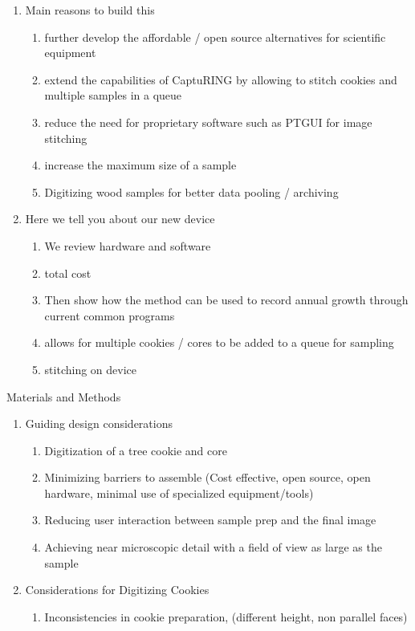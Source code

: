 \documentclass{article}
\begin{document}
\begin{outline}[enumerate]
\begin{enumerate}
	\item Main reasons to build this 
		\begin{enumerate} 
		\item further develop the affordable / open source alternatives for scientific equipment
		\item extend the capabilities of CaptuRING by allowing to stitch cookies and multiple samples in a queue
		\item reduce the need for proprietary software such as PTGUI for image stitching
		\item increase the maximum size of a sample 
		\item Digitizing wood samples for better data pooling / archiving
		\end{enumerate} 
	\item Here we tell you about our new device
		\begin{enumerate}
		\item We review hardware and software 
		\item total cost
		\item Then show how the method can be used to record annual growth through current common programs 
		\item allows for multiple cookies / cores to be added to a queue for sampling
		\item stitching on device 
		\end{enumerate}
	\end{enumerate}
\item Materials and Methods
		\begin{enumerate}
		\item Guiding design considerations
			\begin{enumerate}
			\item Digitization of a tree cookie and core
			\item Minimizing barriers to assemble (Cost effective, open source, open hardware, minimal use of specialized equipment/tools)
			\item Reducing user interaction between sample prep and the final image
			\item Achieving near microscopic detail with a field of view as large as the sample
			\end{enumerate}
		\item Considerations for Digitizing Cookies
			\begin{enumerate}
			\item Inconsistencies in cookie preparation, (different height, non parallel faces)%

\end{enumerate}
\end{enumerate}
\end{outline}
\end{document}
